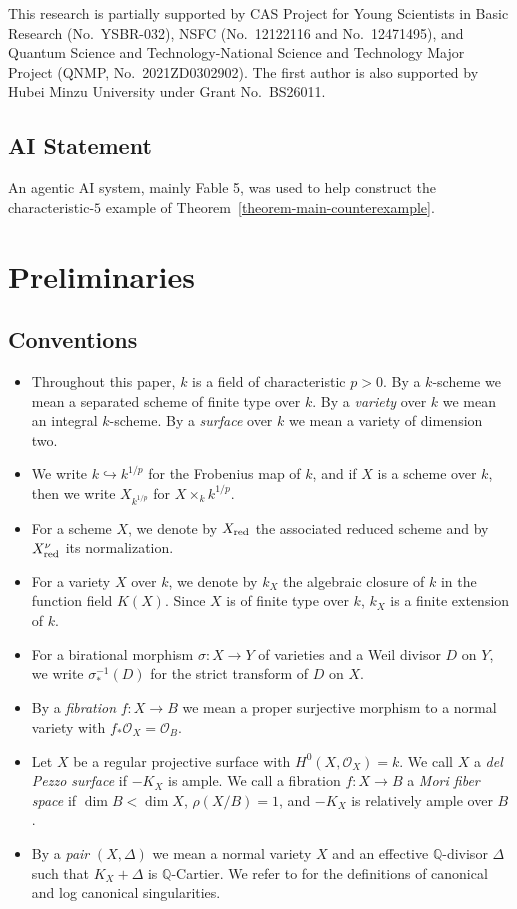 \documentclass[reqno,oneside]{amsart}
\theoremstyle{definition}
\theoremstyle{plain}
\numberwithin{equation}{section}
\begin{document}
This research is partially supported by CAS Project for Young Scientists in Basic Research (No.~YSBR-032), NSFC (No.~12122116 and No.~12471495), and Quantum Science and Technology-National Science and Technology Major Project (QNMP, No.~2021ZD0302902). 
The first author is also supported by Hubei Minzu University under Grant No.~BS26011.

\subsection*{AI Statement}%
An agentic AI system, mainly Fable 5, was used to help construct the characteristic-$5$ example of Theorem~\ref{theorem-main-counterexample}.


\section{Preliminaries}\label{section-preliminary}
\subsection{Conventions} 
\begin{itemize}
  \item Throughout this paper, $k$ is a field of characteristic $p>0$.
   By a $k$-scheme we mean a separated scheme of finite type over $k$.
   By a \emph{variety} over $k$ we mean an integral $k$-scheme.  By a \emph{surface} over $k$ we mean a variety of dimension two.
 \item We write $k\hookrightarrow k^{1/p}$ for the Frobenius map of $k$, and if $X$ is a scheme over $k$, then we write $X_{k^{1/p}}$ for $X \times_k k^{1/p}$.
  \item For a scheme $X$, we denote by $X_{\rm red}$ the associated reduced scheme and by $X_{\rm red}^\nu$ its normalization.
  \item For a variety $X$ over $k$, we denote by $k_X$ the algebraic closure of $k$ in the function field $K(X)$. 
    Since $X$ is of finite type over $k$, $k_X$ is a finite extension of $k$.
  \item For a birational morphism $\sigma\colon X\to Y$ of varieties and a Weil divisor $D$ on $Y$, we write $\sigma^{-1}_*(D)$ for the strict transform of $D$ on $X$.
  \item By a \emph{fibration} $f\colon X\to B$ we mean a proper surjective morphism to a normal variety with $f_*\mathcal O_X = \mathcal O_B$.
  \item Let $X$ be a regular projective surface with $H^0(X, \mathcal{O}_X) = k$.
    We call $X$ a \textit{del Pezzo surface} if $-K_X$ is ample.
    We call a fibration $f \colon X \to B$ a \emph{Mori fiber space} if $\dim B< \dim X$, $\rho(X/B) = 1$, and $-K_X$ is relatively ample over $B$.
  \item By a \emph{pair} $(X,\Delta)$ we mean a normal variety $X$ and an effective $\mathbb Q$-divisor $\Delta$ such that $K_X + \Delta$ is $\mathbb Q$-Cartier.
    We refer to \cite[Definition~2.8]{Kollar-Sing} for the definitions of canonical and log canonical singularities.
\end{itemize}
\end{document}

